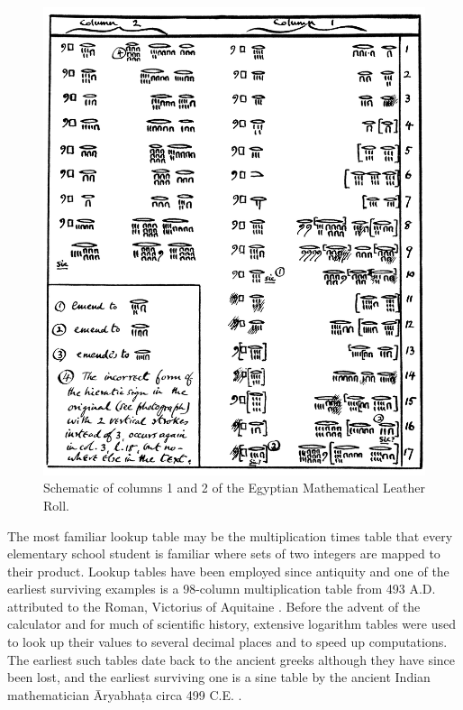 \begin{figure}
  \centering
  \includegraphics[width=\textwidth]{gfx/EMLRschematic}
  \caption[Schematic of columns 1 and 2 of the Egyptian Mathematical Leather Roll.]
  {Schematic of columns 1 and 2 of the Egyptian Mathematical Leather Roll.}
  \label{fig:EMLRschematic}
\end{figure}

The most familiar lookup table may be the multiplication times table that every elementary school student is familiar where sets of two integers are mapped to their product. Lookup tables have been employed since antiquity and one of the earliest surviving examples is a 98-column multiplication table from 493 A.D. attributed to the Roman, Victorius of Aquitaine \citep{Maher01}. Before the advent of the calculator and for much of scientific history, extensive logarithm tables were used to look up their values to several decimal places and to speed up computations. The earliest such tables date back to the ancient greeks although they have since been lost, and the earliest surviving one is a sine table by the ancient Indian mathematician \={A}ryabha\d{t}a circa 499 C.E. \citep{Hayashi97}.

